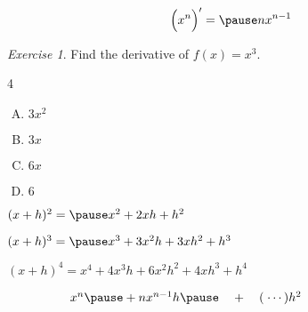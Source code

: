\documentclass[17pt]{beamer} %
\theoremstyle{remark}
\newtheorem{plickers}{Exercise}
\begin{document}
\begin{frame}
\begin{theorem}
\[\Big(x^n\Big)' = \pause nx^{n-1}\]
\end{theorem}

\pause
\begin{plickers}
Find the derivative of $f(x) = x^3$.
\begin{multicols}4
\begin{enumerate}[A.]
\item $3x^2$ \item $3x$ \item $6x$ \item $6$
\end{enumerate}
\end{multicols}
\end{plickers}
\end{frame}

\begin{frame}
\begin{fact}
\par\bigskip
$(x+h)^2 = \pause x^2 + 2xh + h^2$ \pause\par\bigskip
$(x+h)^3 = \pause x^3 + 3x^2h + 3xh^2 + h^3$ \pause\par\bigskip
$(x+h)^4 = x^4 + 4x^3h + 6x^2h^2 + 4xh^3 + h^4$ \pause\par\bigskip\bigskip

%

$\phantom{(x+h)^n = {}}x^n \pause + nx^{n-1}h \pause \quad+\quad (\hspace{0.6ex}\cdots)h^2$ 

\end{fact}
\end{frame}
\end{document}
